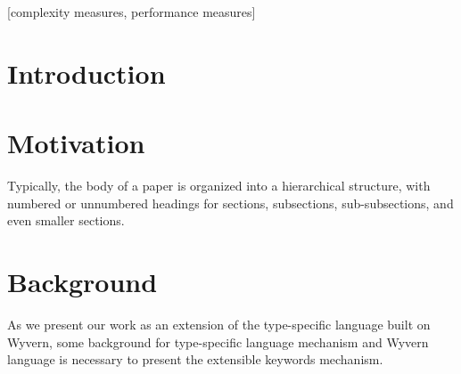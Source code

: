 \documentclass{sig-alternate}
\begin{document}
[complexity measures, performance measures]



\section{Introduction}

\section{Motivation}
Typically, the body of a paper is organized
into a hierarchical structure, with numbered or unnumbered
headings for sections, subsections, sub-subsections, and even
smaller sections.

\section{Background}
As we present our work as an extension of the type-specific language built on Wyvern, some background for type-specific language mechanism and Wyvern language is necessary to present the extensible keywords mechanism. 
\end{document}
